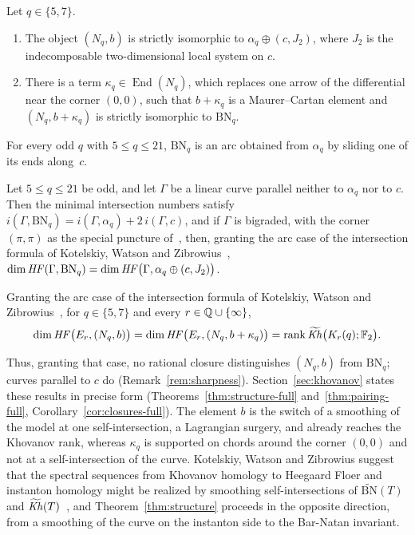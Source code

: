 \begin{theorem}\label{thm:structure}
Let $q\in\{5,7\}$.
\begin{enumerate}
\item The object $(N_q,b)$ is strictly isomorphic to $\alpha_q\oplus(c,J_2)$, where $J_2$ is the
indecomposable two-dimensional local system on $c$.
\item There is a term $\kappa_q\in\operatorname{End}(N_q)$, which replaces one arrow of the differential near
the corner $(0,0)$, such that $b+\kappa_q$ is a Maurer--Cartan element and $(N_q,b+\kappa_q)$ is strictly
isomorphic to $\mathrm{BN}_q$.
\end{enumerate}
For every odd $q$ with $5\le q\le21$, $\mathrm{BN}_q$ is an arc obtained from $\alpha_q$ by sliding one of its
ends along~$c$.
\end{theorem}

\begin{theorem}\label{thm:pairing}
Let $5\le q\le21$ be odd, and let $\Gamma$ be a linear curve parallel neither to $\alpha_q$ nor to $c$.
Then the minimal intersection numbers satisfy $i(\Gamma,\mathrm{BN}_q)=i(\Gamma,\alpha_q)+2\,i(\Gamma,c)$,
and if $\Gamma$ is bigraded, with the corner $(\pi,\pi)$ as the special puncture of~\cite{KWZ}, then,
granting the arc case of the intersection formula of Kotelskiy, Watson and Zibrowius~\cite[Thm.~5.25]{KWZ},
$\dim\mathit{HF}(\Gamma,\mathrm{BN}_q)=\dim\mathit{HF}\bigl(\Gamma,\alpha_q\oplus(c,J_2)\bigr)$.
\end{theorem}

\begin{corollary}\label{cor:closures}
Granting the arc case of the intersection formula of Kotelskiy, Watson and Zibrowius~\cite[Thm.~5.25]{KWZ}, for
$q\in\{5,7\}$ and every $r\in\mathbb{Q}\cup\{\infty\}$,
\[
\dim\mathit{HF}\bigl(E_r,(N_q,b)\bigr)=\dim\mathit{HF}\bigl(E_r,(N_q,b+\kappa_q)\bigr)=\operatorname{rank}\widetilde{\mathit{Kh}}\bigl(K_r(q);\mathbb{F}_2\bigr).
\]
\end{corollary}

Thus, granting that case, no rational closure distinguishes $(N_q,b)$ from $\mathrm{BN}_q$; curves parallel to $c$ do
(Remark~\ref{rem:sharpness}). Section~\ref{sec:khovanov} states these results in precise form
(Theorems~\ref{thm:structure-full} and~\ref{thm:pairing-full}, Corollary~\ref{cor:closures-full}). The
element $b$ is the switch of a smoothing of the model at one self-intersection, a Lagrangian surgery, and
already reaches the Khovanov rank, whereas $\kappa_q$ is supported on chords around the corner $(0,0)$ and
not at a self-intersection of the curve. Kotelskiy, Watson and Zibrowius suggest that the spectral sequences from
Khovanov homology to Heegaard Floer and instanton homology might be realized by smoothing self-intersections
of $\widetilde{\mathrm{BN}}(T)$ and $\widetilde{\mathit{Kh}}(T)$~\cite[\S1.8]{KWZ}, and
Theorem~\ref{thm:structure} proceeds in the opposite direction, from a smoothing of the curve on the
instanton side to the Bar-Natan invariant.

